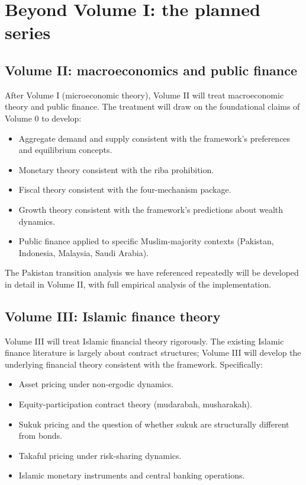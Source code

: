 \section{Beyond Volume I: the planned series}
\label{sec:to-vol1-future}

\subsection{Volume II: macroeconomics and public finance}

After Volume I (microeconomic theory), Volume II will treat
macroeconomic theory and public finance. The treatment will
draw on the foundational claims of Volume 0 to develop:

\begin{itemize}[leftmargin=2em]
    \item Aggregate demand and supply consistent with the
    framework's preferences and equilibrium concepts.
    \item Monetary theory consistent with the riba prohibition.
    \item Fiscal theory consistent with the four-mechanism
    package.
    \item Growth theory consistent with the framework's
    predictions about wealth dynamics.
    \item Public finance applied to specific Muslim-majority
    contexts (Pakistan, Indonesia, Malaysia, Saudi Arabia).
\end{itemize}

The Pakistan transition analysis we have referenced repeatedly
will be developed in detail in Volume II, with full empirical
analysis of the implementation.

\subsection{Volume III: Islamic finance theory}

Volume III will treat Islamic financial theory rigorously. The
existing Islamic finance literature is largely about contract
structures; Volume III will develop the underlying financial
theory consistent with the framework. Specifically:

\begin{itemize}[leftmargin=2em]
    \item Asset pricing under non-ergodic dynamics.
    \item Equity-participation contract theory (mudarabah,
    musharakah).
    \item Sukuk pricing and the question of whether sukuk are
    structurally different from bonds.
    \item Takaful pricing under risk-sharing dynamics.
    \item Islamic monetary instruments and central banking
    operations.
\end{itemize}

